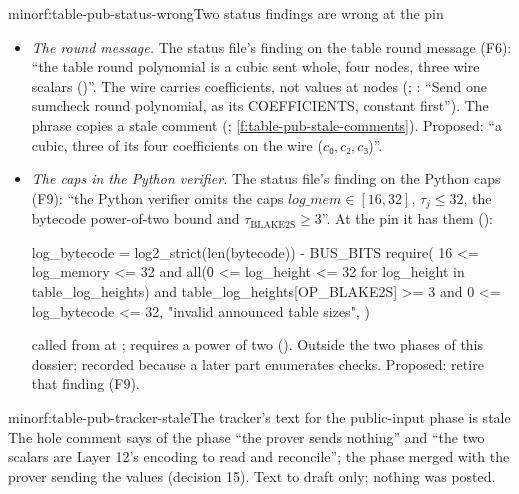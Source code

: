 \begin{finding}{minor}{f:table-pub-status-wrong}{Two status findings are wrong at the pin}
\begin{itemize}
\item \emph{The round message.} The status file's finding on the table round message (F6): ``the
  table round polynomial is a cubic sent whole, four nodes, three wire scalars
  ()''. The wire carries coefficients, not values at nodes
  (; : ``Send one sumcheck round
  polynomial, as its COEFFICIENTS, constant first''). The phrase copies a stale comment
  (; \cref{f:table-pub-stale-comments}). Proposed: ``a cubic, three of its
  four coefficients on the wire ($c₀, c₂, c₃$)''.
\item \emph{The caps in the Python verifier.} The status file's finding on the Python caps (F9):
  ``the Python verifier omits the caps $\mathit{log\_mem} ∈ [16, 32]$, $τ_j ≤ 32$, the bytecode
  power-of-two bound and $τ_{\mathrm{BLAKE2S}} ≥ 3$''. At the pin it has them
  ():
\begin{srccode}
    log_bytecode = log2_strict(len(bytecode)) - BUS_BITS
    require(
        16 <= log_memory <= 32
        and all(0 <= log_height <= 32 for log_height in table_log_heights)
        and table_log_heights[OP_BLAKE2S] >= 3
        and 0 <= log_bytecode <= 32,
        "invalid announced table sizes",
    )
\end{srccode}
  called from  at ;  requires a power of two
  (). Outside the two phases of this dossier; recorded because a later part
  enumerates checks. Proposed: retire that finding (F9).
\end{itemize}
\end{finding}

\begin{finding}{minor}{f:table-pub-tracker-stale}{The tracker's text for the public-input phase is stale}
 The hole comment says of the phase ``the prover sends nothing'' and ``the two
scalars are Layer 12's encoding to read and reconcile''; the phase merged with the prover sending
the values (decision 15). Text to draft only; nothing was posted.
\end{finding}

